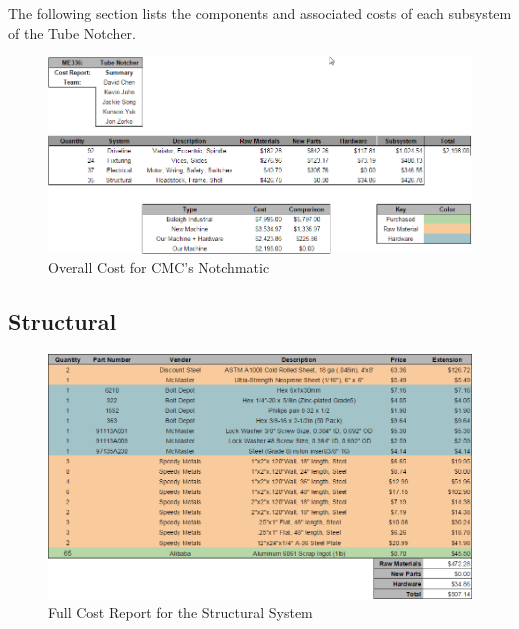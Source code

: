 The following section lists the components and associated costs of each subsystem of the Tube Notcher.

\begin{figure}[H]
    \centering
    \includegraphics[width=1.0\textwidth]{./images/Chapter4-BillofMaterials/Overall}
    \caption{Overall Cost for CMC's Notchmatic}
    \label{fig:Overall}
\end{figure}

\newpage

\subsection{Structural}

\begin{figure}[H]
    \centering
    \includegraphics[width=1.0\textwidth]{./images/Chapter4-BillofMaterials/CRS}
    \caption{Full Cost Report for the Structural System}
    \label{fig:CRS}
\end{figure}

